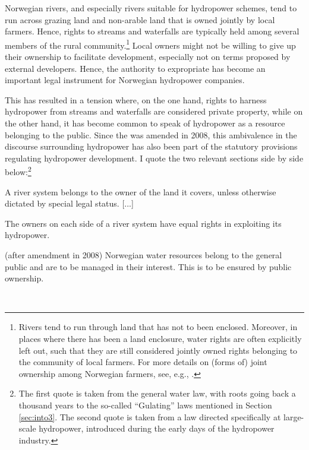 Norwegian rivers, and especially rivers suitable for hydropower schemes, tend to run across grazing land and non-arable land that is owned jointly by local farmers. Hence, rights to streams and waterfalls are typically held among several members of the rural community.\footnote{Rivers tend to run through land that has not to been enclosed. Moreover, in places where there has been a land enclosure, water rights are often explicitly left out, such that they are still considered jointly owned rights belonging to the community of local farmers. For more details on (forms of) joint ownership among Norwegian farmers, see, e.g., \cite[570]{stenseth07}.} Local owners might not be willing to give up their ownership to facilitate development, especially not on terms proposed by external developers. Hence, the authority to expropriate has become an important legal instrument for Norwegian hydropower companies.

This has resulted in a tension where, on the one hand, rights to harness hydropower from streams and waterfalls are considered private property, while on the other hand, it has become common to speak of hydropower as a resource belonging to the public. Since the \cite{ica17} was amended in 2008, this ambivalence in the discourse surrounding hydropower has also been part of the statutory provisions regulating hydropower development. I quote the two relevant sections side by side below:\footnote{The first quote is taken from the general water law, with roots going back a thousand years to the so-called ``Gulating'' laws mentioned in Section \ref{sec:into3}. The second quote is taken from a law directed specifically at large-scale hydropower, introduced during the early days of the hydropower industry.}

{\begin{minipage}[t]{16em}
 \begin{aquote}{\tiny \cite[13]{wra00}} \footnotesize A river system belongs to the owner of the land it covers, unless otherwise dictated by special legal status. [...]

The owners on each side of a river system have equal rights in exploiting its hydropower.
\end{aquote}  
\end{minipage}}
{\begin{minipage}[t]{22em}
\begin{aquote}{\tiny \cite[1]{ica17} (after amendment in 2008)} \footnotesize Norwegian water resources belong to the general public and are to be managed in their interest. This is to be ensured by public ownership.
\end{aquote}
\end{minipage}} \\

